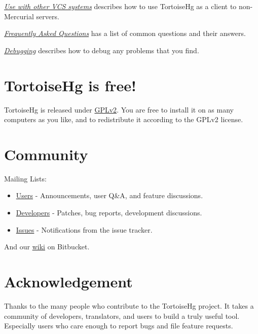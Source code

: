 \documentclass[letterpaper,10pt,english]{manual}
\begin{document}
\hyperlink{--doc-nonhg}{\emph{Use with other VCS systems}} describes how to use TortoiseHg as a client to
non-Mercurial servers.

\hyperlink{--doc-faq}{\emph{Frequently Asked Questions}} has a list of common questions and their answers.

\hyperlink{--doc-debugging}{\emph{Debugging}} describes how to debug any problems that you find.


\section{TortoiseHg is free!}

TortoiseHg is released under
\href{http://www.gnu.org/licenses/gpl-2.0.html}{GPLv2}.  You are free to
install it on as many computers as you like, and to redistribute it
according to the GPLv2 license.


\section{Community}

Mailing Lists:
\begin{itemize}
\item {} 
\href{https://lists.sourceforge.net/lists/listinfo/tortoisehg-discuss}{Users} - Announcements, user Q\&A, and feature discussions.

\item {} 
\href{https://lists.sourceforge.net/lists/listinfo/tortoisehg-develop}{Developers} - Patches, bug reports, development discussions.

\item {} 
\href{https://lists.sourceforge.net/lists/listinfo/tortoisehg-issues}{Issues} - Notifications from the issue tracker.

\end{itemize}

And our \href{http://bitbucket.org/tortoisehg/stable/wiki/Home}{wiki} on Bitbucket.


\section{Acknowledgement}

Thanks to the many people who contribute to the TortoiseHg project.  It
takes a community of developers, translators, and users to build a
truly useful tool.  Especially users who care enough to report bugs and
file feature requests.
\end{document}
